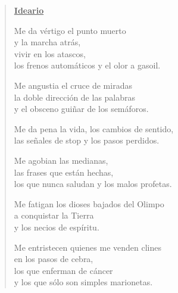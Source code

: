 \begin{verse}

\begin{center}

\underline{\bf Ideario}

Me da vértigo el punto muerto \\

y la marcha atrás, \\

vivir en los atascos, \\

los frenos automáticos y el olor a gasoil.

\par

Me angustia el cruce de miradas \\

la doble dirección de las palabras \\

y el obsceno guiñar de los semáforos.

\par

Me da pena la vida, los cambios de sentido, \\

las señales de stop y los pasos perdidos.

\par

Me agobian las medianas, \\

las frases que están hechas, \\

los que nunca saludan y los malos profetas.

\par

Me fatigan los dioses bajados del Olimpo \\

a conquistar la Tierra \\

y los necios de espíritu.

\par

Me entristecen quienes me venden clines \\

en los pasos de cebra, \\

los que enferman de cáncer \\

y los que sólo son simples marionetas.


\end{center}
\end{verse}

